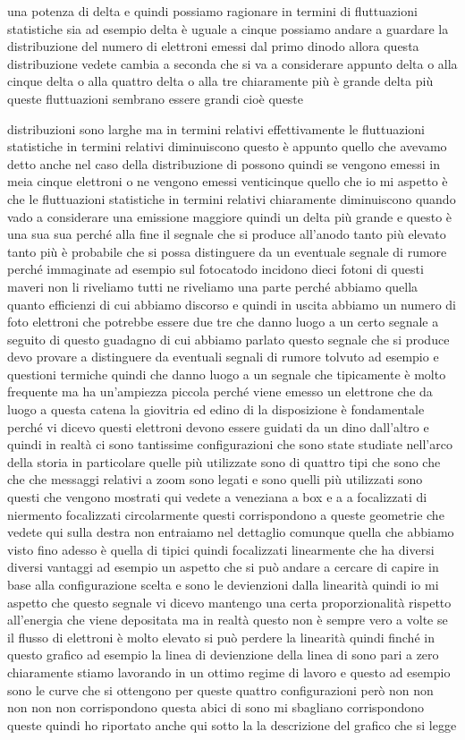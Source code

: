 una potenza di delta e quindi possiamo ragionare in termini di fluttuazioni statistiche sia ad esempio delta è uguale a cinque possiamo andare a guardare la distribuzione del numero di elettroni emessi dal primo dinodo allora questa distribuzione vedete cambia a seconda che si va a considerare appunto delta o alla cinque delta o alla quattro delta o alla tre chiaramente più è grande delta più queste fluttuazioni sembrano essere grandi cioè queste 

distribuzioni sono larghe ma in termini relativi effettivamente le fluttuazioni statistiche in termini relativi diminuiscono questo è appunto quello che avevamo detto anche nel caso della distribuzione di possono quindi se vengono emessi in meia cinque elettroni o ne vengono emessi venticinque quello che io mi aspetto è che le fluttuazioni statistiche in termini relativi chiaramente diminuiscono quando vado a considerare una emissione maggiore quindi un delta più grande e questo è una sua sua perché alla fine il segnale che si produce all'anodo tanto più elevato tanto più è probabile che si possa distinguere da un eventuale segnale di rumore perché immaginate ad esempio sul fotocatodo incidono dieci fotoni di questi maveri non li riveliamo tutti ne riveliamo una parte perché abbiamo quella quanto efficienzi di cui abbiamo discorso e quindi in uscita abbiamo un numero di foto elettroni che potrebbe essere due tre che danno luogo a un certo segnale a seguito di questo guadagno di cui abbiamo parlato questo segnale che si produce devo provare a distinguere da eventuali segnali di rumore tolvuto ad esempio e questioni termiche quindi che danno luogo a un segnale che tipicamente è molto frequente ma ha un'ampiezza piccola perché viene emesso un elettrone che da luogo a questa catena la giovitria ed edino di la disposizione è fondamentale perché vi dicevo questi elettroni devono essere guidati da un dino dall'altro e quindi in realtà ci sono tantissime configurazioni che sono state studiate nell'arco della storia in particolare quelle più utilizzate sono di quattro tipi che sono che che che messaggi relativi a zoom sono legati e sono quelli più utilizzati sono questi che vengono mostrati qui vedete a veneziana a box e a a focalizzati di niermento focalizzati circolarmente questi corrispondono a queste geometrie che vedete qui sulla destra non entraiamo nel dettaglio comunque quella che abbiamo visto fino adesso è quella di tipici quindi focalizzati linearmente che ha diversi diversi vantaggi ad esempio un aspetto che si può andare a cercare di capire in base alla configurazione scelta e sono le devienzioni dalla linearità quindi io mi aspetto che questo segnale vi dicevo mantengo una certa proporzionalità rispetto all'energia che viene depositata ma in realtà questo non è sempre vero a volte se il flusso di elettroni è molto elevato si può perdere la linearità quindi finché in questo grafico ad esempio la linea di devienzione della linea di sono pari a zero chiaramente stiamo lavorando in un ottimo regime di lavoro e questo ad esempio sono le curve che si ottengono per queste quattro configurazioni però non non non non non corrispondono questa abici di sono mi sbagliano corrispondono queste quindi ho riportato anche qui sotto la la descrizione del grafico che si legge 